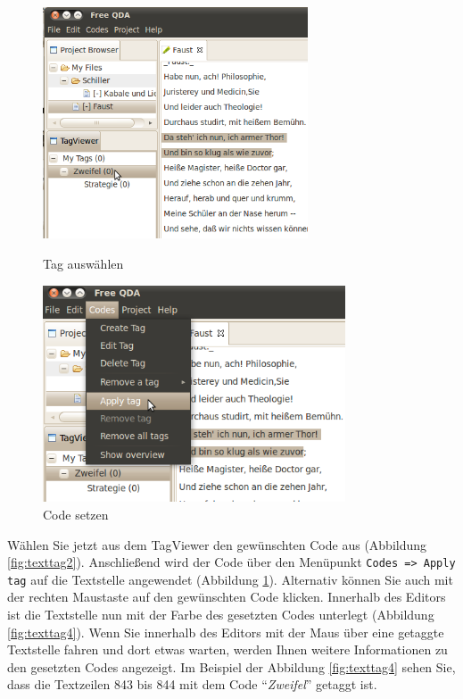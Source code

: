 \begin{figure}[!hbt]
\begin{minipage}[!hb!]{0.5\textwidth}\scriptsize
	\centering
	 \includegraphics[width=0.7\textwidth]{img/tagtext2}
	\caption{Tag auswählen}
	\label{fig:texttag2}
\end{minipage}
\hfill
\begin{minipage}[!hb!]{0.5\textwidth}
	\centering
	 \includegraphics[width=0.8\textwidth]{img/tagtext3}
	\caption{Code setzen}
	\label{fig:texttag3}
\end{minipage}
\end{figure}

Wählen Sie jetzt aus dem TagViewer den gewünschten Code aus (Abbildung \ref{fig:texttag2}). Anschließend wird der Code über den Menüpunkt %
\texttt{Codes => Apply tag} auf die Textstelle angewendet (Abbildung \ref{fig:texttag3}).  Alternativ können Sie auch mit der rechten Maustaste %
auf den gewünschten Code klicken. %
Innerhalb des Editors ist die Textstelle nun mit der Farbe des gesetzten %
Codes unterlegt (Abbildung \ref{fig:texttag4}). Wenn Sie innerhalb des Editors mit der Maus über eine getaggte Textstelle fahren und dort %
etwas warten, werden Ihnen weitere Informationen zu den gesetzten Codes angezeigt. Im Beispiel der Abbildung \ref{fig:texttag4} sehen Sie, %
dass die Textzeilen 843 bis 844 mit dem Code ``\textit{Zweifel}'' getaggt ist.


